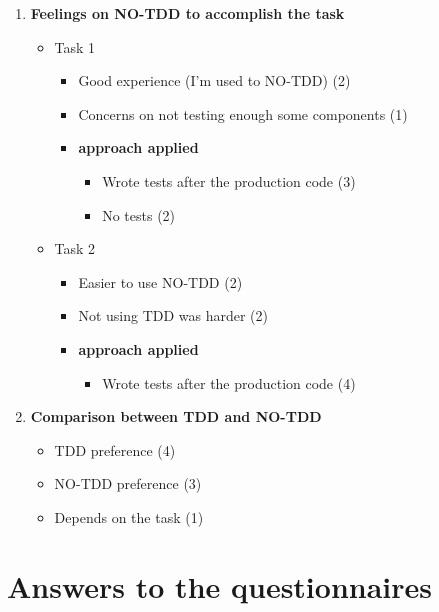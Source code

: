 \begin{enumerate}
    \item \textbf{Feelings on NO-TDD to accomplish the task}
    \begin{itemize}
        \item Task 1
        \begin{itemize}
            \item Good experience (I’m used to NO-TDD) (2)
            \item Concerns on not testing enough some components (1)
            \item \textbf{\notdd approach applied}
            \begin{itemize}
                \item Wrote tests after the production code (3)
                \item No tests (2)
            \end{itemize}
        \end{itemize}

        \item Task 2
        \begin{itemize}
            \item Easier to use NO-TDD (2)
            \item Not using TDD was harder (2)
            \item \textbf{\notdd approach applied}
            \begin{itemize}
                \item Wrote tests after the production code (4)
            \end{itemize}
        \end{itemize}
    \end{itemize}
    
    \item \textbf{Comparison between TDD and NO-TDD}
    \begin{itemize}
        \item TDD preference (4)
        \item NO-TDD preference (3)
        \item Depends on the task (1)
    \end{itemize}
\end{enumerate}

\section{Answers to the questionnaires}
